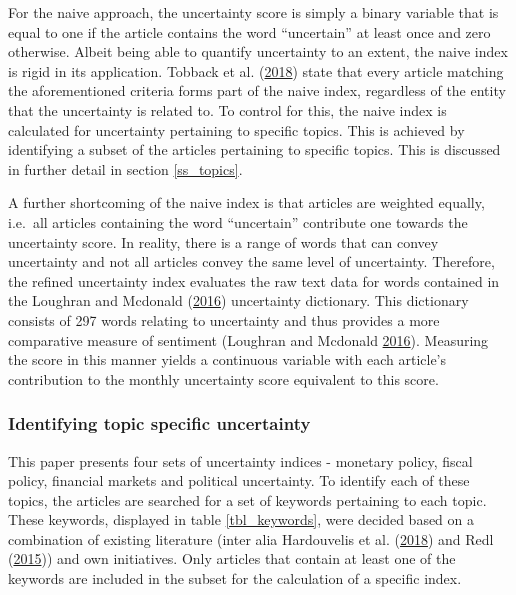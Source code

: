 \documentclass[11pt,preprint, authoryear]{elsarticle}
\numberwithin{equation}{section}
\numberwithin{figure}{section}
\numberwithin{table}{section}
\begin{document}
For the naive approach, the uncertainty score is simply a binary
variable that is equal to one if the article contains the word
``uncertain'' at least once and zero otherwise. Albeit being able to
quantify uncertainty to an extent, the naive index is rigid in its
application. Tobback et al. (\protect\hyperlink{ref-Tobback2018}{2018})
state that every article matching the aforementioned criteria forms part
of the naive index, regardless of the entity that the uncertainty is
related to. To control for this, the naive index is calculated for
uncertainty pertaining to specific topics. This is achieved by
identifying a subset of the articles pertaining to specific topics. This
is discussed in further detail in section \ref{ss_topics}.

A further shortcoming of the naive index is that articles are weighted
equally, i.e.~all articles containing the word ``uncertain'' contribute
one towards the uncertainty score. In reality, there is a range of words
that can convey uncertainty and not all articles convey the same level
of uncertainty. Therefore, the refined uncertainty index evaluates the
raw text data for words contained in the Loughran and Mcdonald
(\protect\hyperlink{ref-Loughran2016}{2016}) uncertainty dictionary.
This dictionary consists of 297 words relating to uncertainty and thus
provides a more comparative measure of sentiment (Loughran and Mcdonald
\protect\hyperlink{ref-Loughran2016}{2016}). Measuring the score in this
manner yields a continuous variable with each article's contribution to
the monthly uncertainty score equivalent to this score.

\subsubsection{\texorpdfstring{Identifying topic specific uncertainty
\label{ss_topics}}{Identifying topic specific uncertainty }}\label{identifying-topic-specific-uncertainty}

This paper presents four sets of uncertainty indices - monetary policy,
fiscal policy, financial markets and political uncertainty. To identify
each of these topics, the articles are searched for a set of keywords
pertaining to each topic. These keywords, displayed in table
\ref{tbl_keywords}, were decided based on a combination of existing
literature (inter alia Hardouvelis et al.
(\protect\hyperlink{ref-Hardouvelis2018}{2018}) and Redl
(\protect\hyperlink{ref-Redl2015}{2015})) and own initiatives. Only
articles that contain at least one of the keywords are included in the
subset for the calculation of a specific index.
\end{document}
